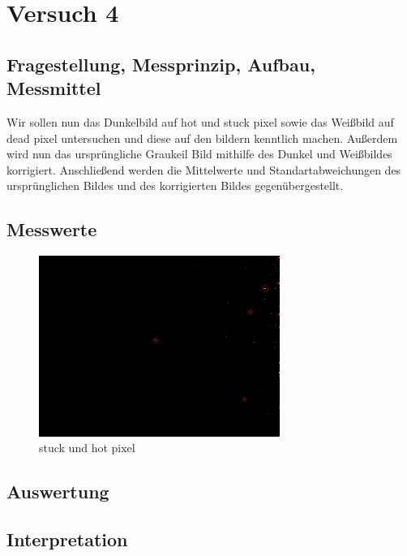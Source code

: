\documentclass[TGAI_Laborbericht.tex]{subfiles}
\begin{document}
\chapter{Versuch 4}
\label{chap:VERSUCH_4}

\section{Fragestellung, Messprinzip, Aufbau, Messmittel}
\label{chap:VERSUCH_4_FRAGESTELLUNG}
Wir sollen nun das Dunkelbild auf hot und stuck pixel sowie das Weißbild auf dead pixel untersuchen und diese auf den bildern kenntlich machen. Außerdem wird nun das ursprüngliche Graukeil Bild mithilfe des Dunkel und Weißbildes korrigiert. Anschließend werden die Mittelwerte und Standartabweichungen des ursprünglichen Bildes und des korrigierten Bildes gegenübergestellt.

\section{Messwerte}
\label{chap:VERSUCH_4_MESSWERTE}
\begin{figure}[H]
	\includegraphics[width=0.7\textwidth]{media/stuck&hotpixel.png}
	\caption{stuck und hot pixel}
	\label{fig:stuck und hot pixel}
\end{figure}

\section{Auswertung}
\label{chap:VERSUCH_4_AUSWERTUNG}

\section{Interpretation}
\label{chap:VERSUCH_4_INTERPRETATION}
\end{document}
